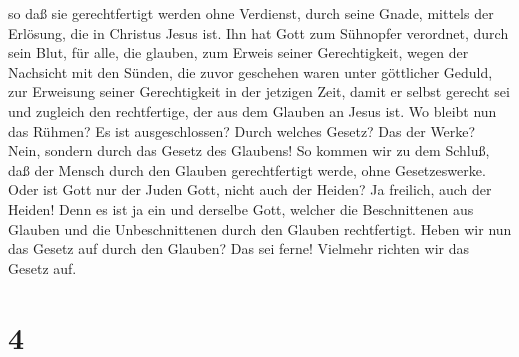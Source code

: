  so daß sie gerechtfertigt werden ohne Verdienst, durch
seine Gnade, mittels der Erlösung, die in Christus Jesus ist.
 Ihn hat Gott zum Sühnopfer verordnet, durch sein Blut,
für alle, die glauben, zum Erweis seiner Gerechtigkeit, wegen der
Nachsicht mit den Sünden, die zuvor geschehen waren unter göttlicher
Geduld,  zur Erweisung seiner Gerechtigkeit in der
jetzigen Zeit, damit er selbst gerecht sei und zugleich den
rechtfertige, der aus dem Glauben an Jesus ist.  Wo
bleibt nun das Rühmen? Es ist ausgeschlossen? Durch welches Gesetz? Das
der Werke? Nein, sondern durch das Gesetz des Glaubens! 
So kommen wir zu dem Schluß, daß der Mensch durch den Glauben
gerechtfertigt werde, ohne Gesetzeswerke.  Oder ist Gott
nur der Juden Gott, nicht auch der Heiden? Ja freilich, auch der Heiden!
 Denn es ist ja ein und derselbe Gott, welcher die
Beschnittenen aus Glauben und die Unbeschnittenen durch den Glauben
rechtfertigt.  Heben wir nun das Gesetz auf durch den
Glauben? Das sei ferne! Vielmehr richten wir das Gesetz auf.

\hypertarget{section-3}{%
\section{4}\label{section-3}}

